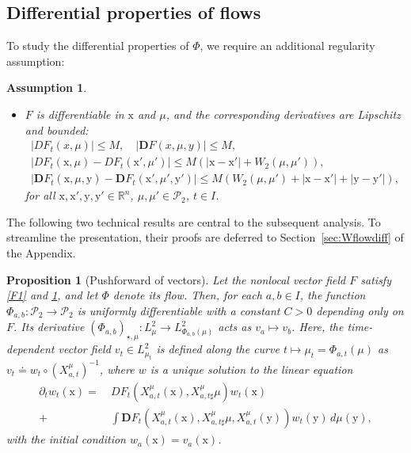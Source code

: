 \documentclass[sn-mathphys-num]{sn-jnl}
\numberwithin{equation}{section}
\theoremstyle{mythm}
\newtheorem{proposition}{Proposition}[section]
\theoremstyle{mydef}
\newtheorem{assumption}{Assumption}\renewcommand{\theassumption}{(A\arabic{assumption})}  %
\renewcommand{\d}{\,d}
\renewcommand{\mathbf}[1]{\bm{#1}}
\begin{document}
\subsection{Differential properties of flows}

To study the differential properties of \( \Phi \), we require an additional regularity assumption:

\begin{tcolorbox}
\begin{assumption}
\label{F2}
~
\begin{itemize}
  \item \( F \) is differentiable in \( \mathrm{x} \) and \( \mu \), and the corresponding derivatives are Lipschitz and bounded:
  \begin{gather*}
    \left|DF_t(x,\mu)\right|\le M, \quad \left|\mathbf{D}F(x,\mu,y)\right|\le M,\\
    \left|DF_t(\mathrm{x},\mu) - DF_t(\mathrm{x}',\mu')\right|\le M\left(|\mathrm{x}-\mathrm{x}'|+W_{2}(\mu,\mu')\right),\\
    \left|\mathbf{D}F_t(\mathrm{x},\mu,\mathrm{y}) - \mathbf{D}F_t(\mathrm{x}',\mu',\mathrm{y}')\right|\le M\left(W_{2}(\mu,\mu') + |\mathrm{x}-\mathrm{x}'|+ |\mathrm{y}-\mathrm{y}'|\right),
  \end{gather*}
  for all \( \mathrm{x},\mathrm{x}',\mathrm{y},\mathrm{y}'\in \mathbb{R}^n \), \( \mu,\mu'\in \mathcal{P}_2 \), \( t\in I \).
\end{itemize}
\end{assumption}
\end{tcolorbox}

The following two technical results are central to the subsequent analysis. 
To streamline the presentation, their proofs are deferred to Section~\ref{sec:Wflowdiff} of the Appendix.
\begin{proposition}[Pushforward of vectors]
  \label{prop:Wflowdiff}
  Let the nonlocal vector field \( F \) satisfy \ref{F1} and \ref{F2}, and let \( \Phi \) denote its flow.
  Then, for each \( a,b\in I \), the function \( \Phi_{a,b} \colon \mathcal{P}_2 \to \mathcal{P}_2 \) is uniformly differentiable with a constant \( C>0 \) depending only on \( F \).
  Its derivative \( (\Phi_{a,b})_{\star,\mu}\colon {L}^2_{\mu}\to L^{2}_{\Phi_{a,b}(\mu)} \) acts as \( v_a \mapsto v_b \).
Here, the time-dependent vector field \( v_t\in L^{2}_{\mu_t} \) is defined along the curve \(t \mapsto \mu_{t}= \Phi_{a,t}(\mu)\) as
 \( v_t \doteq w_t\circ (X^{\mu}_{a,t})^{-1} \), where \( w \) is a unique solution to the linear equation
  \begin{align}
    \partial_t w_t(\mathrm{x}) = & \ DF_t\left(X^{\mu}_{a,t}(\mathrm{x}),X^{\mu}_{a,t\sharp}\mu\right)w_t(\mathrm{x}) \nonumber\\
    + &  \,\int\mathbf{D}F_t\left(X^{\mu}_{a,t}(\mathrm{x}),X^{\mu}_{a,t\sharp}\mu, X^{\mu}_{a,t}(\mathrm{y})\right)w_t(\mathrm{y})\d\mu(\mathrm{y}),\label{eq:Ww}
  \end{align}
  with the initial condition \( w_{a}(\mathrm{x}) = v_a(\mathrm{x}) \).
\end{proposition}
\end{document}
